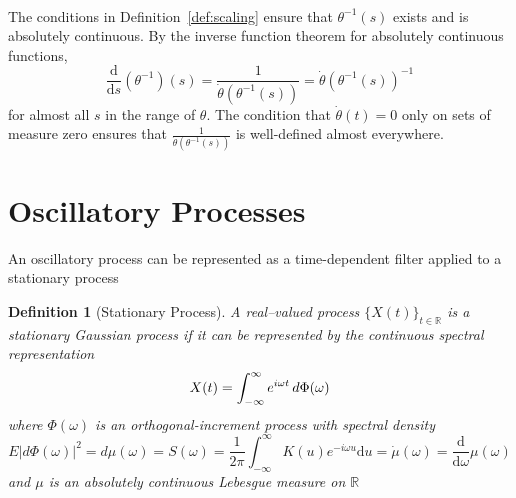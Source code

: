 \documentclass{article}
\newcommand{\mathd}{\mathrm{d}}
\newtheorem{definition}{Definition}
\begin{document}
\

\begin{remark}
  \label{rem:inverse_properties}The conditions in Definition~\ref{def:scaling}
  ensure that $\theta^{- 1} (s)$ exists and is absolutely continuous. By the
  inverse function theorem for absolutely continuous functions,
  \begin{equation}
    \frac{\mathd}{\mathd s} (\theta^{- 1}) (s) = \frac{1}{\dot{\theta}
    (\theta^{- 1} (s))} = \dot{\theta} (\theta^{- 1} (s))^{- 1}
  \end{equation}
  for almost all $s$ in the range of $\theta$. The condition that
  $\dot{\theta} (t) = 0$ only on sets of measure zero ensures that
  $\frac{1}{\dot{\theta} (\theta^{- 1} (s))}$ is well-defined almost
  everywhere.
\end{remark}

\section{Oscillatory Processes}

An oscillatory process can be represented as a time-dependent filter applied
to a stationary process

\begin{definition}
  [Stationary Process] A real--valued process $\{X (t) \}_{t \in \mathbb{R}}$
  is a stationary Gaussian process if it can be represented by the continuous
  spectral representation
  \begin{equation}
    \label{eq:stationary_rep} X (t) = \int_{- \infty}^{\infty} e^{i \omega t} 
    \hspace{0.17em} d \Phi (\omega)
  \end{equation}
  where $\Phi (\omega)$ is an orthogonal-increment process with spectral
  density
  \begin{equation}
    E \lvert d \Phi (\omega) \rvert^2 = d \mu (\omega) = S (\omega) =
    \frac{1}{2 \pi} \int_{- \infty}^{\infty} K (u) e^{- i \omega u} \mathd u =
    \dot{\mu} (\omega) = \frac{\mathd}{\mathd \omega} \mu (\omega)
  \end{equation}
  and $\mu$ is an absolutely continuous Lebesgue measure on $\mathbb{R}$ 
\end{definition}
\end{document}
